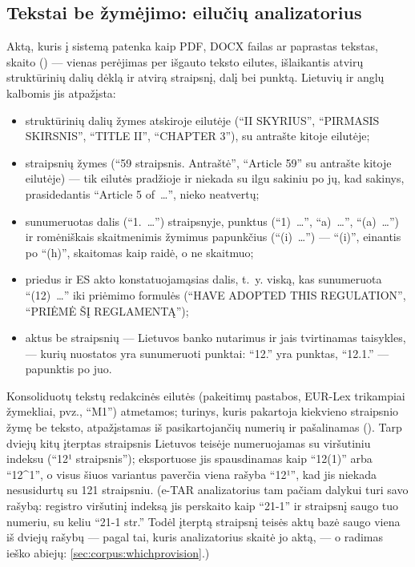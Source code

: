 \subsection{Tekstai be žymėjimo: eilučių analizatorius}\label{sec:corpus:line}

Aktą, kuris į sistemą patenka kaip PDF, DOCX failas ar paprastas tekstas, skaito
 () --- vienas perėjimas per išgauto teksto
eilutes, išlaikantis atvirų struktūrinių dalių dėklą ir atvirą straipsnį, dalį bei punktą. Lietuvių ir
anglų kalbomis jis atpažįsta:

\begin{itemize}
  \item struktūrinių dalių žymes atskiroje eilutėje (\enquote{II SKYRIUS}, \enquote{PIRMASIS
    SKIRSNIS}, \enquote{TITLE II}, \enquote{CHAPTER 3}), su antrašte kitoje eilutėje;
  \item straipsnių žymes (\enquote{59 straipsnis. Antraštė}, \enquote{Article 59} su
    antrašte kitoje eilutėje) --- tik eilutės pradžioje ir niekada su ilgu sakiniu po jų, kad
    sakinys, prasidedantis \enquote{Article 5 of~…}, nieko neatvertų;
  \item sunumeruotas dalis (\enquote{1.~…}) straipsnyje, punktus (\enquote{1)~…},
    \enquote{a)~…}, \enquote{(a)~…}) ir romėniškais skaitmenimis žymimus papunkčius
    (\enquote{(i)~…}) --- \enquote{(i)}, einantis po \enquote{(h)}, skaitomas kaip raidė, o ne
    skaitmuo;
  \item priedus ir ES akto konstatuojamąsias dalis, t.~y. viską, kas sunumeruota
    \enquote{(12)~…} iki priėmimo formulės (\enquote{HAVE ADOPTED THIS REGULATION},
    \enquote{PRIĖMĖ ŠĮ REGLAMENTĄ});
  \item aktus be straipsnių --- Lietuvos banko nutarimus ir jais tvirtinamas taisykles, ---
    kurių nuostatos yra sunumeruoti punktai: \enquote{12.} yra punktas, \enquote{12.1.} ---
    papunktis po juo.
\end{itemize}

Konsoliduotų tekstų redakcinės eilutės (pakeitimų pastabos, EUR-Lex trikampiai žymekliai,
pvz., \enquote{M1}) atmetamos; turinys, kuris pakartoja kiekvieno straipsnio žymę be teksto,
atpažįstamas iš pasikartojančių numerių ir pašalinamas (). Tarp
dviejų kitų įterptas straipsnis Lietuvos teisėje numeruojamas su viršutiniu indeksu
(\enquote{12¹ straipsnis}); eksportuose jis spausdinamas kaip \enquote{12(1)} arba
\enquote{12\textasciicircum 1}, o  visus šiuos variantus paverčia viena
rašyba \enquote{12¹}, kad jis niekada nesusidurtų su 121 straipsniu. (e-TAR analizatorius tam
pačiam dalykui turi savo rašybą: registro viršutinį indeksą jis perskaito kaip \enquote{21-1}
ir straipsnį saugo tuo numeriu, su keliu \enquote{21-1 str.} Todėl įterptą straipsnį teisės
aktų bazė saugo viena iš dviejų rašybų --- pagal tai, kuris analizatorius skaitė jo aktą, --- o
radimas ieško abiejų: \cref{sec:corpus:whichprovision}.)

